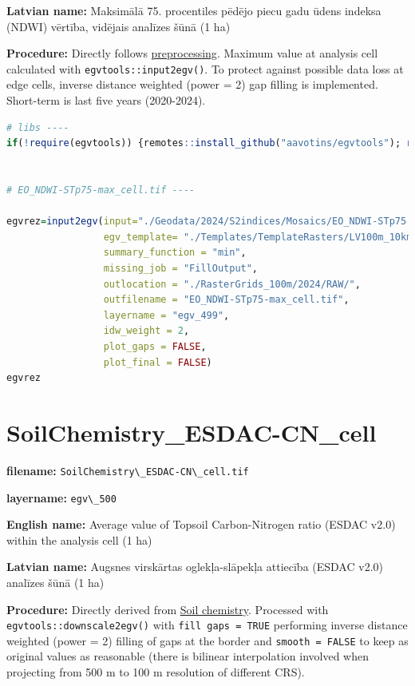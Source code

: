 \documentclass[
]{book}
\newcommand{\passthrough}[1]{#1}
\begin{document}
\textbf{Latvian name:} Maksimālā 75. procentiles pēdējo piecu gadu ūdens indeksa (NDWI) vērtība, vidējais analīzes šūnā (1 ha)

\textbf{Procedure:} Directly follows \hyperref[Ch04.13]{preprocessing}. Maximum value at analysis cell
calculated with \passthrough{\lstinline!egvtools::input2egv()!}. To protect against possible data loss at edge cells,
inverse distance weighted (power = 2) gap filling is implemented. Short-term is last five years (2020-2024).

\begin{lstlisting}[language=R]
# libs ----
if(!require(egvtools)) {remotes::install_github("aavotins/egvtools"); require(egvtools)}


# EO_NDWI-STp75-max_cell.tif ----

egvrez=input2egv(input="./Geodata/2024/S2indices/Mosaics/EO_NDWI-STp75.tif",
                 egv_template= "./Templates/TemplateRasters/LV100m_10km.tif",
                 summary_function = "min",
                 missing_job = "FillOutput",
                 outlocation = "./RasterGrids_100m/2024/RAW/",
                 outfilename = "EO_NDWI-STp75-max_cell.tif",
                 layername = "egv_499",
                 idw_weight = 2,
                 plot_gaps = FALSE,
                 plot_final = FALSE)
egvrez
\end{lstlisting}

\section{SoilChemistry\_ESDAC-CN\_cell}\label{ch06.500}

\textbf{filename:} \passthrough{\lstinline!SoilChemistry\_ESDAC-CN\_cell.tif!}

\textbf{layername:} \passthrough{\lstinline!egv\_500!}

\textbf{English name:} Average value of Topsoil Carbon-Nitrogen ratio (ESDAC v2.0) within the analysis cell (1 ha)

\textbf{Latvian name:} Augsnes virskārtas oglekļa-slāpekļa attiecība (ESDAC v2.0) analīzes šūnā (1 ha)

\textbf{Procedure:} Directly derived from \hyperref[Ch04.07.01]{Soil chemistry}. Processed
with \passthrough{\lstinline!egvtools::downscale2egv()!} with \passthrough{\lstinline!fill gaps = TRUE!} performing inverse
distance weighted (power = 2) filling of gaps at the border and \passthrough{\lstinline!smooth = FALSE!}
to keep as original values as reasonable (there is bilinear interpolation
involved when projecting from 500 m to 100 m resolution of different CRS).
\end{document}

